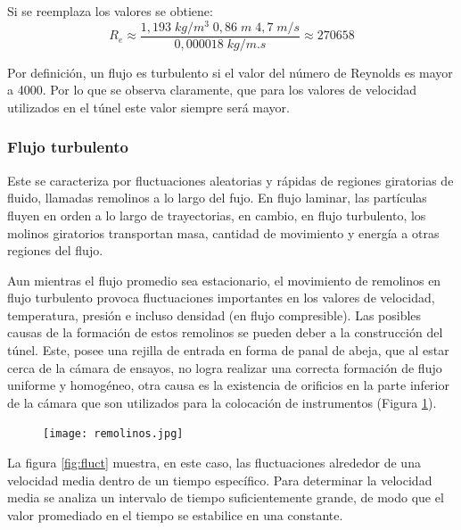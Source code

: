 Si se reemplaza los valores se obtiene:
\begin{equation} 
	R_e\approx \frac{1,193\;kg/m^{3}\;0,86\;m\;4,7\;m/s}{0,000018\;kg/m.s}\approx 270658
	\label{reyn2}
\end{equation}	

Por definición, un flujo es turbulento si el valor del número de Reynolds es mayor a 4000. Por lo que se observa claramente, que para los valores de velocidad utilizados en el túnel este valor siempre será mayor.

\subsubsection{Flujo turbulento} \label{sec:flujoT}
\begin{tcolorbox}[colback=blue!5!white,colframe=blue!75!black,title=Flujo turbulento]
	Este se caracteriza por fluctuaciones aleatorias y rápidas de regiones giratorias de fluido, llamadas remolinos a lo largo del fujo. En flujo laminar, las partículas fluyen en orden a lo largo de trayectorias, en cambio, en flujo turbulento, los molinos giratorios transportan masa, cantidad de movimiento y energía a otras regiones del flujo. \cite{yunus2006mecanica}
	
\end{tcolorbox}

Aun mientras el flujo promedio sea estacionario, el movimiento de remolinos en flujo turbulento provoca fluctuaciones importantes en los valores de velocidad, temperatura, presión e incluso densidad (en flujo compresible). Las posibles causas de la formación de estos remolinos se pueden deber a la construcción del túnel. Este, posee una rejilla de entrada en forma de panal de abeja, que al estar cerca de la cámara de ensayos, no logra realizar una correcta formación de flujo uniforme y homogéneo, otra causa es la existencia de orificios en la parte inferior de la cámara que son utilizados para la colocación de instrumentos (Figura \ref{fig:remolinos}).


\begin{figure}[h!]
	\centering
	\texttt{[image: remolinos.jpg]}
	\label{fig:remolinos}
\end{figure}


La figura \ref{fig:fluct} muestra, en este caso, las fluctuaciones alrededor de una velocidad media dentro de un tiempo específico. 
Para determinar la velocidad media se analiza un intervalo de tiempo suficientemente grande, de modo que el valor promediado en el tiempo se estabilice en una constante.

